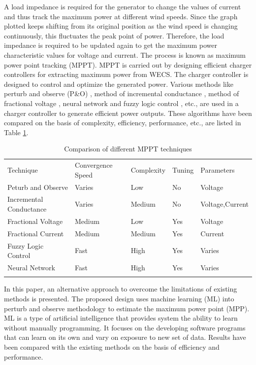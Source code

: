 A load impedance is required for the generator to change the values of current and thus track the maximum power at different wind speeds. Since the graph plotted keeps shifting from its original position as the wind speed is changing continuously, this fluctuates the peak point of power. Therefore, the load impedance is required to be updated again to get the maximum power characteristic values for voltage and current. The process is known as maximum power point tracking (MPPT). MPPT is carried out by designing efficient charger controllers for extracting maximum power from WECS. The charger controller is designed to control and optimize the generated power. Various methods like perturb and observe (P\&O) \cite{RefJ3}, method of incremental conductance \cite{RefJ4}, method of fractional voltage \cite{RefJ5}, neural network \cite{RefJ6} and fuzzy logic control \cite{RefJ7}, etc., are  used in a charger controller to generate efficient power outputs. These algorithms have been compared on the basis of complexity, efficiency, performance, etc., are listed in Table \ref{Table:1}.
\begin{table}
\label{Table:1}       %
\caption{ Comparison of  different MPPT techniques \cite{RefJ6}}
\begin{tabular}{lllll}
\hline\noalign{\smallskip}
Technique & Convergence Speed & Complexity &Tuning & Parameters  \\
\noalign{\smallskip}\hline\noalign{\smallskip}
Peturb and Observe & Varies & Low &  No & Voltage \\
Incremental Conductance  &  Varies & Medium & No & Voltage,Current \\
Fractional Voltage & Medium & Low & Yes & Voltage \\
Fractional Current & Medium & Medium & Yes & Current \\
Fuzzy Logic Control & Fast & High & Yes & Varies \\
Neural Network & Fast & High & Yes & Varies \\
\noalign{\smallskip}\hline
\end{tabular}
\end{table}
In this paper, an alternative approach to overcome the limitations of existing methods is presented. The proposed design uses machine learning (ML) into perturb and observe  methodology to estimate the maximum power point (MPP). ML is a type of artificial intelligence that provides system the ability to learn without manually programming. It focuses on the developing software programs that can learn on its own and vary on exposure to new set of data. Results have been compared with the existing methods on the basis of efficiency and performance.
